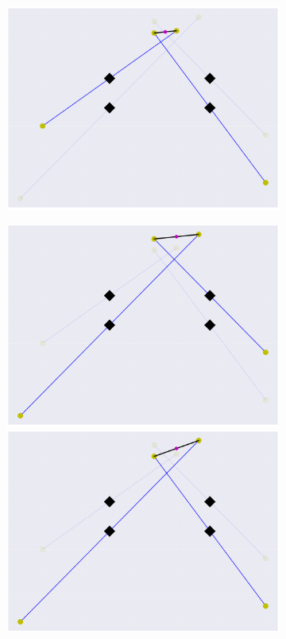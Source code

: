 \begin{figure}
\begin{subfigure}{0.45\textwidth}
        \includegraphics[width=0.8\linewidth]{Plots/stereo_magic_3.pdf}
    \end{subfigure}
    \begin{subfigure}{0.45\textwidth}
        \includegraphics[width=0.8\linewidth]{Plots/stereo_magic_4.pdf} 
        \includegraphics[width=0.8\linewidth]{Plots/stereo_magic_6.pdf} 

\end{subfigure}
\end{figure}
